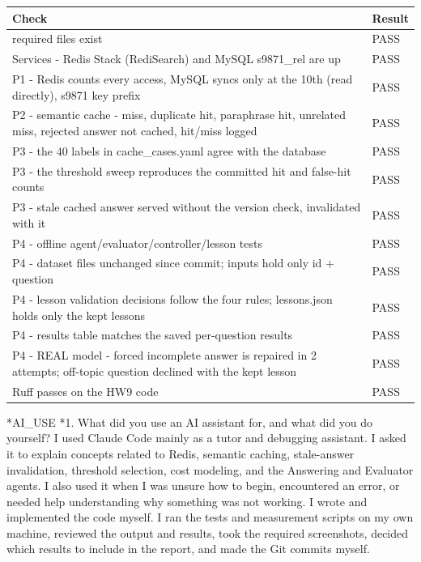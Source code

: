 \documentclass[11pt]{article}
\makeatletter
\renewcommand\section{\@startsection{section}{1}{\z@}{-3.0ex \@plus -1ex \@minus -.2ex}{1.2ex \@plus.2ex}{\normalfont\fontsize{14}{17}\selectfont\bfseries}}
\renewcommand\subsection{\@startsection{subsection}{2}{\z@}{-2.2ex \@plus -1ex \@minus -.2ex}{0.8ex \@plus.2ex}{\normalfont\fontsize{12}{14.5}\selectfont\bfseries}}
\makeatother
\begin{document}
\begin{center}
{\footnotesize\setlength{\tabcolsep}{3pt}
\begin{tabular}{>{\raggedright\arraybackslash}p{5.4in}l}
\toprule
\textbf{Check} & \textbf{Result} \\
\midrule
required files exist & PASS \\
Services - Redis Stack (RediSearch) and MySQL s9871\_\allowbreak{}rel are up & PASS \\
P1 - Redis counts every access, MySQL syncs only at the 10th (read directly), s9871 key prefix & PASS \\
P2 - semantic cache - miss, duplicate hit, paraphrase hit, unrelated miss, rejected answer not cached, hit/miss logged & PASS \\
P3 - the 40 labels in cache\_\allowbreak{}cases.yaml agree with the database & PASS \\
P3 - the threshold sweep reproduces the committed hit and false-hit counts & PASS \\
P3 - stale cached answer served without the version check, invalidated with it & PASS \\
P4 - offline agent/evaluator/controller/lesson tests & PASS \\
P4 - dataset files unchanged since commit; inputs hold only id + question & PASS \\
P4 - lesson validation decisions follow the four rules; lessons.json holds only the kept lessons & PASS \\
P4 - results table matches the saved per-question results & PASS \\
P4 - REAL model - forced incomplete answer is repaired in 2 attempts; off-topic question declined with the kept lesson & PASS \\
Ruff passes on the HW9 code & PASS \\
\bottomrule
\end{tabular}}
\end{center}
\section*{AI\_USE}
\subsection*{1. What did you use an AI assistant for, and what did you do yourself?}
I used Claude Code mainly as a tutor and debugging assistant. I asked it to explain concepts related to Redis, semantic caching, stale-answer invalidation, threshold selection, cost modeling, and the Answering and Evaluator agents. I also used it when I was unsure how to begin, encountered an error, or needed help understanding why something was not working. I wrote and implemented the code myself. I ran the tests and measurement scripts on my own machine, reviewed the output and results, took the required screenshots, decided which results to include in the report, and made the Git commits myself.
\end{document}
